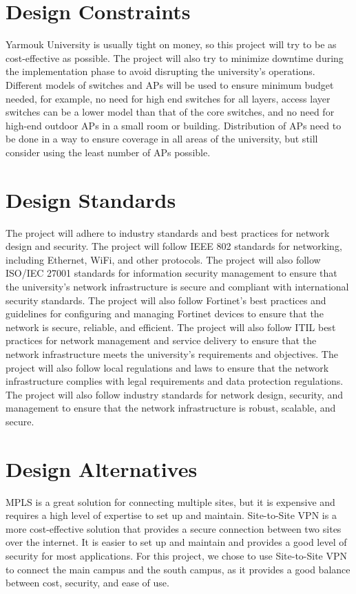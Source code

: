 \documentclass[12pt]{report}
\begin{document}
\section{Design Constraints}

Yarmouk University is usually tight on money, so this project will try to be as cost-effective as possible. The project will also try to minimize downtime during the implementation phase to avoid disrupting the university's operations. Different models of switches and APs will be used to ensure minimum budget needed, for example, no need for high end switches for all layers, access layer switches can be a lower model than that of the core switches, and no need for high-end outdoor APs in a small room or building. Distribution of APs need to be done in a way to ensure coverage in all areas of the university, but still consider using the least number of APs possible. \cite{YUMoneyIssue}

\section{Design Standards}
The project will adhere to industry standards and best practices for network design and security. The project will follow IEEE 802 standards for networking, including Ethernet, WiFi, and other protocols. The project will also follow ISO/IEC 27001 standards for information security management to ensure that the university's network infrastructure is secure and compliant with international security standards. The project will also follow Fortinet's best practices and guidelines for configuring and managing Fortinet devices to ensure that the network is secure, reliable, and efficient. The project will also follow ITIL best practices for network management and service delivery to ensure that the network infrastructure meets the university's requirements and objectives. The project will also follow local regulations and laws to ensure that the network infrastructure complies with legal requirements and data protection regulations. The project will also follow industry standards for network design, security, and management to ensure that the network infrastructure is robust, scalable, and secure. \cite{IEEE802} \cite{ISO27001} \cite{ITIL}

\section{Design Alternatives}
MPLS is a great solution for connecting multiple sites, but it is expensive and requires a high level of expertise to set up and maintain. Site-to-Site VPN is a more cost-effective solution that provides a secure connection between two sites over the internet. It is easier to set up and maintain and provides a good level of security for most applications. For this project, we chose to use Site-to-Site VPN to connect the main campus and the south campus, as it provides a good balance between cost, security, and ease of use.
\newpage
\end{document}
